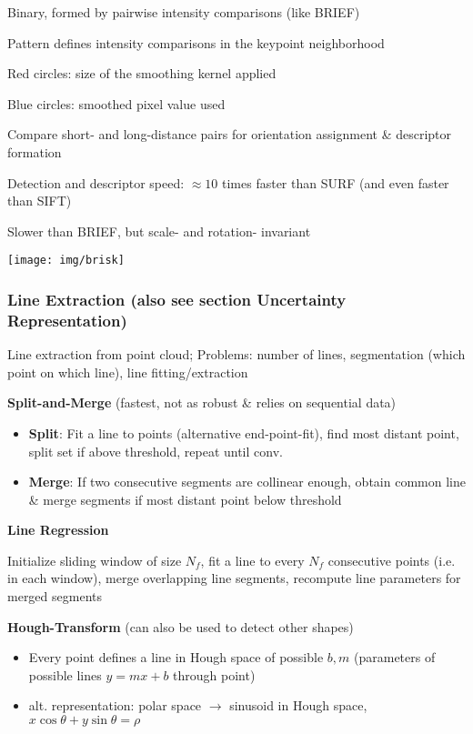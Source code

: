 \documentclass[fontsize=6pt]{scrartcl}
\begin{document}
\begin{multicols*}{4}
Binary, formed by pairwise intensity comparisons (like BRIEF)

Pattern defines intensity comparisons in the keypoint neighborhood
\begin{minipage}{0.74\linewidth}
Red circles: size of the smoothing kernel applied

Blue circles: smoothed pixel value used

Compare short- and long-distance pairs for orientation assignment \& descriptor formation

Detection and descriptor speed: $\approx 10$ times faster than SURF (and even faster than SIFT)

Slower than BRIEF, but scale- and rotation- invariant
\end{minipage}
\begin{minipage}{0.25\linewidth}
	\texttt{[image: img/brisk]}
\end{minipage}


\subsubsection*{Line Extraction (also see section Uncertainty Representation)}

Line extraction from point cloud; Problems: number of lines, segmentation (which point on which line), line fitting/extraction

\textbf{Split-and-Merge} (fastest, not as robust \& relies on sequential data)
\begin{itemize}
	\item \textbf{Split}: Fit a line to points (alternative end-point-fit), find most distant point, split set if above threshold, repeat until conv.
	\item \textbf{Merge}: If two consecutive segments are collinear enough, obtain common line \& merge segments if most distant point below threshold
\end{itemize}

\textbf{Line Regression}

Initialize sliding window of size $N_f$, fit a line to every $N_f$ consecutive points (i.e. in each window), merge overlapping line segments, recompute line parameters for merged segments

\textbf{Hough-Transform} (can also be used to detect other shapes)
\begin{itemize}
	\item Every point defines a line in Hough space of possible $b, m$ (parameters of possible lines $y=mx+b$ through point)
	\item alt. representation: polar space $\rightarrow$ sinusoid in Hough space, $x\cos \theta + y \sin \theta = \rho$
\end{itemize}


\end{multicols*}
\end{document}

